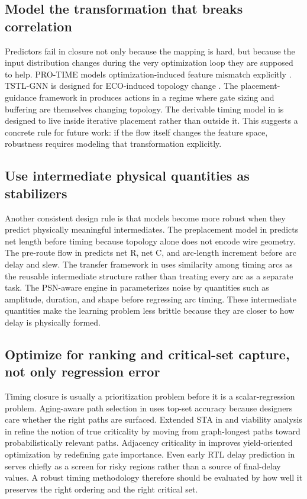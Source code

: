 \documentclass[num-refs]{wiley-article}
\begin{document}
  \subsection{Model the transformation that breaks correlation}

  Predictors fail in closure not only because the mapping is hard, but because the input distribution changes during the very optimization loop they are supposed to help. PRO-TIME models optimization-induced feature mismatch explicitly \cite{ref8}. TSTL-GNN is designed for ECO-induced topology change \cite{ref19}. The placement-guidance framework in \cite{ref1} produces actions in a regime where gate sizing and buffering are themselves changing topology. The derivable timing model in \cite{ref3} is designed to live inside iterative placement rather than outside it. This suggests a concrete rule for future work: if the flow itself changes the feature space, robustness requires modeling that transformation explicitly.


  \subsection{Use intermediate physical quantities as stabilizers}

  Another consistent design rule is that models become more robust when they predict physically meaningful intermediates. The preplacement model in \cite{ref29} predicts net length before timing because topology alone does not encode wire geometry. The pre-route flow in \cite{ref17} predicts net R, net C, and arc-length increment before arc delay and slew. The transfer framework in \cite{ref4} uses similarity among timing arcs as the reusable intermediate structure rather than treating every arc as a separate task. The PSN-aware engine in \cite{ref12} parameterizes noise by quantities such as amplitude, duration, and shape before regressing arc timing. These intermediate quantities make the learning problem less brittle because they are closer to how delay is physically formed.


  \subsection{Optimize for ranking and critical-set capture, not only regression error}

  Timing closure is usually a prioritization problem before it is a scalar-regression problem. Aging-aware path selection in \cite{ref23} uses top-set accuracy because designers care whether the right paths are surfaced. Extended STA in \cite{ref37} and viability analysis in \cite{ref40} refine the notion of true criticality by moving from graph-longest paths toward probabilistically relevant paths. Adjacency criticality in \cite{ref35} improves yield-oriented optimization by redefining gate importance. Even early RTL delay prediction in \cite{ref27} serves chiefly as a screen for risky regions rather than a source of final-delay values. A robust timing methodology therefore should be evaluated by how well it preserves the right ordering and the right critical set.
\end{document}
